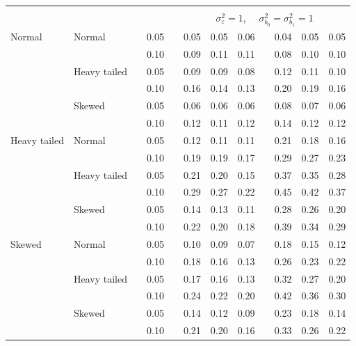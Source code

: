 \documentclass[12pt]{article} %
\begin{document}
\begin{table}[ht]
\begin{scriptsize}
\begin{center}
\begin{tabular}{ll p{.1cm} c p{.1cm} rrr p{.1cm} rrr}
&&&&&&&&&&&\\
& && && \multicolumn{7}{c}{$\sigma_{\varepsilon}^2 = 1$, \ \ $\sigma_{b_0}^2 = \sigma_{b_1}^2 = 1$} \\ \cline{6-12}
Normal       & Normal       && 0.05 &&  0.05 & 0.05 & 0.06 && 0.04 & 0.05 & 0.05 \\ 
             &              && 0.10 &&  0.09 & 0.11 & 0.11 && 0.08 & 0.10 & 0.10 \\ 
             & Heavy tailed && 0.05 &&  0.09 & 0.09 & 0.08 && 0.12 & 0.11 & 0.10 \\ 
             &              && 0.10 &&  0.16 & 0.14 & 0.13 && 0.20 & 0.19 & 0.16 \\ 
             & Skewed       && 0.05 &&  0.06 & 0.06 & 0.06 && 0.08 & 0.07 & 0.06 \\ 
             &              && 0.10 &&  0.12 & 0.11 & 0.12 && 0.14 & 0.12 & 0.12 \\ 
Heavy tailed & Normal       && 0.05 &&  0.12 & 0.11 & 0.11 && 0.21 & 0.18 & 0.16 \\ 
             &              && 0.10 &&  0.19 & 0.19 & 0.17 && 0.29 & 0.27 & 0.23 \\ 
             & Heavy tailed && 0.05 &&  0.21 & 0.20 & 0.15 && 0.37 & 0.35 & 0.28 \\ 
             &              && 0.10 &&  0.29 & 0.27 & 0.22 && 0.45 & 0.42 & 0.37 \\ 
             & Skewed       && 0.05 &&  0.14 & 0.13 & 0.11 && 0.28 & 0.26 & 0.20 \\ 
             &              && 0.10 &&  0.22 & 0.20 & 0.18 && 0.39 & 0.34 & 0.29 \\ 
Skewed       & Normal       && 0.05 &&  0.10 & 0.09 & 0.07 && 0.18 & 0.15 & 0.12 \\ 
             &              && 0.10 &&  0.18 & 0.16 & 0.13 && 0.26 & 0.23 & 0.22 \\ 
             & Heavy tailed && 0.05 &&  0.17 & 0.16 & 0.13 && 0.32 & 0.27 & 0.20 \\ 
             &              && 0.10 &&  0.24 & 0.22 & 0.20 && 0.42 & 0.36 & 0.30 \\ 
             & Skewed       && 0.05 &&  0.14 & 0.12 & 0.09 && 0.23 & 0.18 & 0.14 \\ 
             &              && 0.10 &&  0.21 & 0.20 & 0.16 && 0.33 & 0.26 & 0.22 \\ 



\end{tabular}
\end{center}
\end{scriptsize}
\end{table}
\end{document}
